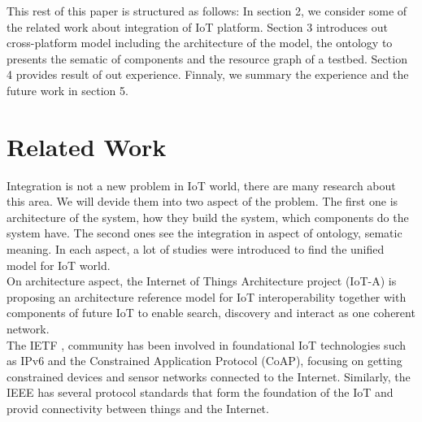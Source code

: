\documentclass[runningheads,a4paper]{llncs}
\begin{document}
This rest of this paper is structured as follows: In section 2, we consider some of the related work about integration of IoT platform. Section 3 introduces out cross-platform model including the architecture of the model, the ontology to presents the sematic of components and the resource graph of a testbed. Section 4 provides result of out experience. Finnaly, we summary the experience and the future work in section 5.

\newpage

\section{Related Work}


Integration is not a new problem in IoT world, there are many research about this area. We will devide them into two aspect of the problem. The first one is architecture of the system, how they build the system, which components do the system have. The second ones see the integration in aspect of ontology, sematic meaning. In each aspect, a lot of studies were introduced to find the unified model for IoT world.\\

On architecture aspect, the Internet of Things Architecture project (IoT-A) \cite{IoT-A} is proposing an architecture reference model for IoT interoperability together with components of future IoT to enable search, discovery and interact as one coherent network.  \\

The IETF \cite{IETF-1}, \cite{IETF-2} community has been involved in foundational IoT technologies such as IPv6 and the Constrained Application Protocol (CoAP), focusing on getting constrained devices and sensor networks connected to the Internet. Similarly, the IEEE \cite{IEEE} has several protocol standards that form the foundation of the IoT and provid connectivity between things and the Internet. \\
\end{document}
